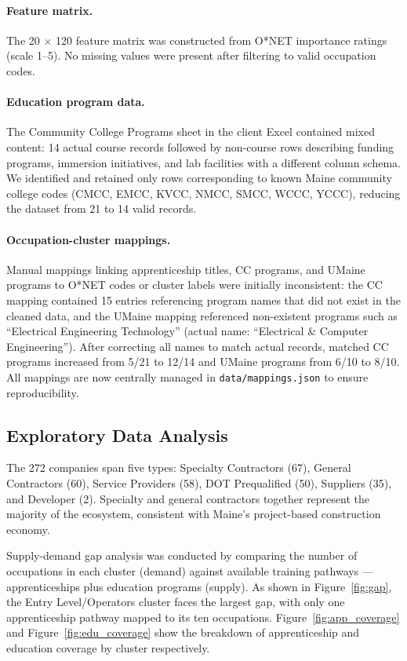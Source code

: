 \documentclass[12pt]{article}
\begin{document}
\paragraph{Feature matrix.}
The 20 $\times$ 120 feature matrix was constructed from O*NET
importance ratings (scale 1--5). No missing values were present
after filtering to valid occupation codes.

\paragraph{Education program data.}
The Community College Programs sheet in the client Excel
contained mixed content: 14 actual course records followed by
non-course rows describing funding programs, immersion
initiatives, and lab facilities with a different column schema.
We identified and retained only rows corresponding to known
Maine community college codes (CMCC, EMCC, KVCC, NMCC, SMCC,
WCCC, YCCC), reducing the dataset from 21 to 14 valid records.

\paragraph{Occupation-cluster mappings.}
Manual mappings linking apprenticeship titles, CC programs, and
UMaine programs to O*NET codes or cluster labels were initially
inconsistent: the CC mapping contained 15 entries referencing
program names that did not exist in the cleaned data, and the
UMaine mapping referenced non-existent programs such as
``Electrical Engineering Technology'' (actual name: ``Electrical
\& Computer Engineering''). After correcting all names to match
actual records, matched CC programs increased from 5/21 to
12/14 and UMaine programs from 6/10 to 8/10. All mappings are
now centrally managed in \texttt{data/mappings.json} to ensure
reproducibility.

\subsection{Exploratory Data Analysis}

The 272 companies span five types: Specialty Contractors (67),
General Contractors (60), Service Providers (58), DOT
Prequalified (50), Suppliers (35), and Developer (2). Specialty
and general contractors together represent the majority of the
ecosystem, consistent with Maine's project-based construction
economy.

Supply-demand gap analysis was conducted by comparing the number
of occupations in each cluster (demand) against available
training pathways --- apprenticeships plus education programs
(supply). As shown in Figure~\ref{fig:gap}, the Entry
Level/Operators cluster faces the largest gap, with only one
apprenticeship pathway mapped to its ten occupations.
Figure~\ref{fig:app_coverage} and Figure~\ref{fig:edu_coverage}
show the breakdown of apprenticeship and education coverage
by cluster respectively.
\end{document}
